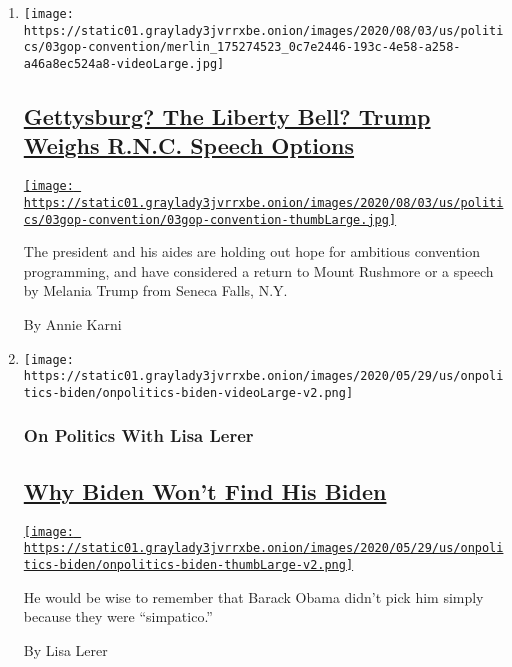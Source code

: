\begin{enumerate}
\def\labelenumi{\arabic{enumi}.}
\item
  \texttt{[image: https://static01.graylady3jvrrxbe.onion/images/2020/08/03/us/politics/03gop-convention/merlin\_175274523\_0c7e2446-193c-4e58-a258-a46a8ec524a8-videoLarge.jpg]}

  \hypertarget{gettysburg-the-liberty-bell-trump-weighs-rnc-speech-options}{%
  \subsection{\texorpdfstring{\href{/2020/08/03/us/politics/trump-rnc-speech.html}{Gettysburg?
  The Liberty Bell? Trump Weighs R.N.C. Speech
  Options}}{Gettysburg? The Liberty Bell? Trump Weighs R.N.C. Speech Options}}\label{gettysburg-the-liberty-bell-trump-weighs-rnc-speech-options}}

  \href{/2020/08/03/us/politics/trump-rnc-speech.html}{\texttt{[image: https://static01.graylady3jvrrxbe.onion/images/2020/08/03/us/politics/03gop-convention/03gop-convention-thumbLarge.jpg]}}

  The president and his aides are holding out hope for ambitious
  convention programming, and have considered a return to Mount Rushmore
  or a speech by Melania Trump from Seneca Falls, N.Y.

  By Annie Karni
\item
  \texttt{[image: https://static01.graylady3jvrrxbe.onion/images/2020/05/29/us/onpolitics-biden/onpolitics-biden-videoLarge-v2.png]}

  \hypertarget{on-politics-with-lisa-lerer}{%
  \subsubsection{On Politics With Lisa
  Lerer}\label{on-politics-with-lisa-lerer}}

  \hypertarget{why-biden-wont-find-his-biden}{%
  \subsection{\texorpdfstring{\href{/2020/08/03/us/politics/joe-biden-vp.html}{Why
  Biden Won't Find His
  Biden}}{Why Biden Won't Find His Biden}}\label{why-biden-wont-find-his-biden}}

  \href{/2020/08/03/us/politics/joe-biden-vp.html}{\texttt{[image: https://static01.graylady3jvrrxbe.onion/images/2020/05/29/us/onpolitics-biden/onpolitics-biden-thumbLarge-v2.png]}}

  He would be wise to remember that Barack Obama didn't pick him simply
  because they were ``simpatico.''

  By Lisa Lerer
\end{enumerate}

